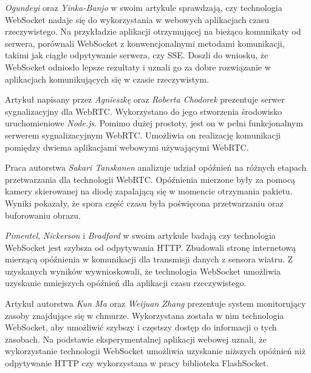 \documentclass[language=polish,type=master]{aghmodern}
\begin{document}
\emph{Ogundeyi} oraz \emph{Yinka-Banjo} w swoim artykule \cite{websocket_realtime} sprawdzają, czy technologia WebSocket nadaje się do wykorzystania w webowych aplikacjach czasu rzeczywistego.
Na przykładzie aplikacji otrzymującej na bieżąco komunikaty od serwera, porównali WebSocket z konwencjonalnymi metodami komunikacji, takimi jak ciągłe odpytywanie serwera, czy SSE.
Doszli do wniosku, że WebSocket odniosło lepsze rezultaty i uznali go za dobre rozwiązanie w aplikacjach komunikujących się w czasie rzeczywistym.

Artykuł \cite{webrtc_signaling} napisany przez \emph{Agnieszkę} oraz \emph{Roberta Chodorek} prezentuje serwer sygnalizacyjny dla WebRTC.
Wykorzystano do jego stworzenia środowisko uruchomieniowe \emph{Node.js}.
Pomimo dużej prostoty, jest on w pełni funkcjonalnym serwerem sygnalizacyjnym WebRTC.
Umożliwia on realizację komunikacji pomiędzy dwiema aplikacjami webowymi używającymi WebRTC.

Praca \cite{webrtc_latency} autorstwa \emph{Sakari Tanskanen} analizuje udział opóźnień na różnych etapach przetwarzania dla technologii WebRTC.
Opóźnienia mierzone były za pomocą kamery skierowanej na diodę zapalającą się w momencie otrzymania pakietu.
Wyniki pokazały, że spora część czasu była poświęcona przetwarzaniu oraz buforowaniu obrazu.

\emph{Pimentel}, \emph{Nickerson} i \emph{Bradford} w swoim artykule \cite{websocket_sensor} badają czy technologia WebSocket jest szybsza od odpytywania HTTP.
Zbudowali stronę internetową mierzącą opóźnienia w komunikacji dla transmisji danych z sensora wiatru.
Z uzyskanych wyników wywnioskowali, że technologia WebSocket umożliwia uzyskanie mniejszych opóźnień dla aplikacji czasu rzeczywistego.

Artykuł \cite{websocket_monitoring} autorstwa \emph{Kun Ma} oraz \emph{Weijuan Zhang} prezentuje system monitorujący zasoby znajdujące się w chmurze.
Wykorzystana została w nim technologia WebSocket, aby umożliwić szybszy i częstszy dostęp do informacji o tych zasobach.
Na podstawie eksperymentalnej aplikacji webowej uznali, że wykorzystanie technologii WebSocket umożliwia uzyskanie niższych opóźnień niż odpytywanie HTTP czy wykorzystana w pracy biblioteka FlashSocket.
\end{document}
